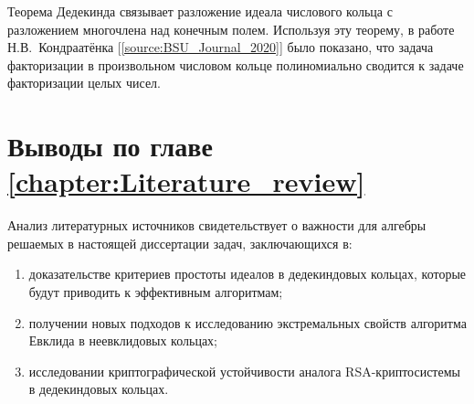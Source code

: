 \documentclass[_00_dissertation.tex]{subfiles}
\begin{document}
Теорема Дедекинда связывает разложение идеала числового кольца с разложением многочлена над конечным полем.
Используя эту теорему, в работе Н.В.~Кондраатёнка [\ref{source:BSU_Journal_2020}] было показано, что задача факторизации в произвольном числовом кольце полиномиально сводится к задаче факторизации целых чисел.

\section*{Выводы по главе \ref{chapter:Literature_review}}

Анализ литературных источников свидетельствует о важности для алгебры решаемых в настоящей диссертации задач, заключающихся в:
\begin{enumerate}
    \item доказательстве критериев простоты идеалов в дедекиндовых кольцах, которые будут приводить к эффективным алгоритмам;

    \item получении новых подходов к исследованию экстремальных свойств алгоритма Евклида в неевклидовых кольцах;

    \item исследовании криптографической устойчивости аналога RSA-криптосистемы в дедекиндовых кольцах.
\end{enumerate}

\onlyinsubfile{
    
}
\end{document}
